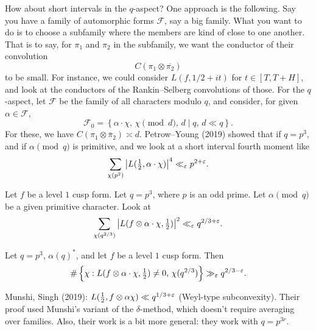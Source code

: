 \documentclass[reqno]{amsart} 
\begin{document}
How about short intervals in the $q$-aspect?  One approach is the following.  Say you have a family of automorphic forms $\mathcal{F}$, say a big family.  What you want to do is to choose a subfamily where the members are kind of close to one another.  That is to say, for $\pi_1$ and $\pi_2$ in the subfamily, we want the conductor of their convolution
\begin{equation*}
  C (\pi_1 \otimes \overline{\pi_2 })
\end{equation*}
to be small.  For instance, we could consider $L(f, 1/2 + i t)$ for $t \in [T,T+H]$, and look at the conductors of the Rankin--Selberg convolutions of those.  For the $q$-aspect, let $\mathcal{F}$ be the family of all characters modulo $q$, and consider, for given $\alpha \in \mathcal{F}$,
\begin{equation*}
  \mathcal{F}_0 = \left\{ \alpha \cdot \chi, \, \chi \pmod{d}, \, d \mid q, \, d \ll q \right\}.
\end{equation*}
For these, we have $C (\pi_1 \otimes \bar{\pi }_2 ) \asymp d$.  Petrow--Young (2019) showed that if $q = p^3$, and if $\alpha \pmod{q}$ is primitive, and we look at a short interval fourth moment like
\begin{equation*}
  \sum_{\chi(p^2)}
  \left\lvert L (\tfrac{1}{2}, \alpha \cdot \chi ) \right\rvert^4 \ll_{\varepsilon}
  p^{2 + \varepsilon }.
\end{equation*}

\begin{theorem}[D. 2023]
  Let $f$ be a level $1$ cusp form.  Let $q = p^3$, where $p$ is an odd prime.  Let $\alpha \pmod{q}$ be a given primitive character.  Look at
  \begin{equation*}
    \sum_{\chi  (q^{2/3})}
    \left\lvert L (f \otimes \alpha \cdot \chi, \tfrac{1}{2} ) \right\rvert^2
    \ll_\varepsilon q^{2/3 + \varepsilon }.
  \end{equation*}

\end{theorem}
\begin{corollary}[D. 2019]
  Let $q = p^3 $, $\alpha (q)^*$, and let $f$ be a level $1$ cusp form.  Then
  \begin{equation*}
    \# \left\{ \chi : L (f \otimes \alpha \cdot \chi, \tfrac{1}{2} ) \neq 0,
      \,
      \chi (q^{2/3} )
    \right\}
    \gg_\varepsilon q^{2/3 - \varepsilon }.
\end{equation*}
\end{corollary}

Munshi, Singh (2019): $L (\tfrac{1}{2}, f \otimes \alpha \chi ) \ll q^{1/3 + \varepsilon }$ (Weyl-type subconvexity).  Their proof used Munshi's variant of the $\delta$-method, which doesn't require averaging over families.  Also, their work is a bit more general: they work with $q = p^{3 r}$.
\end{document}
